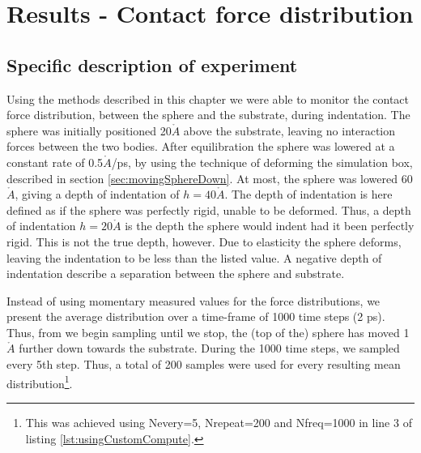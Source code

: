 \documentclass[twoside,english]{uiofysmaster}
\begin{document}
  

\section{Results - Contact force distribution} \label{sec:resultsRadialForceDistribution}

\subsection{Specific description of experiment} \label{sec:resultsRadialForceDistributionSpecificDescriptionOfExperiment}
Using the methods described in this chapter we were able to monitor the contact force distribution, between the sphere and the substrate, during indentation. 
The sphere was initially positioned 20$\mathring{A}$ above the substrate, leaving no interaction forces between the two bodies.  
After equilibration the sphere was lowered at a constant rate of 0.5$\mathring{A}$/ps, by using the technique of deforming the simulation box, described in section \ref{sec:movingSphereDown}. 
At most, the sphere was lowered 60$\mathring{A}$, giving a depth of indentation of $h=40\mathring{A}$. 
The depth of indentation is here defined as if the sphere was perfectly rigid, unable to be deformed. 
Thus, a depth of indentation $h=20 \mathring{A}$ is the depth the sphere would indent had it been perfectly rigid. 
This is not the true depth, however. 
Due to elasticity the sphere deforms, leaving the indentation to be less than the listed value. 
A negative depth of indentation describe a separation between the sphere and substrate.   


Instead of using momentary measured values for the force distributions, we present the average distribution over a time-frame of 1000 time steps (2 ps). 
Thus, from we begin sampling until we stop, the (top of the) sphere has moved 1$\mathring{A}$ further down towards the substrate.  
During the 1000 time steps, we sampled every 5th step. 
Thus, a total of 200 samples were used for every resulting mean distribution\footnote{This was achieved using  Nevery=5,  Nrepeat=200 and Nfreq=1000 in line 3 of listing \ref{lst:usingCustomCompute}.}.
\end{document}
